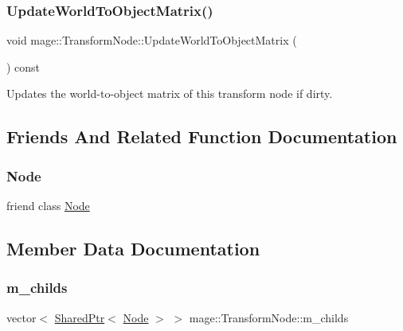 \subsubsection{\texorpdfstring{Update\+World\+To\+Object\+Matrix()}{UpdateWorldToObjectMatrix()}}
{\footnotesize\ttfamily void mage\+::\+Transform\+Node\+::\+Update\+World\+To\+Object\+Matrix (\begin{DoxyParamCaption}{ }\end{DoxyParamCaption}) const\hspace{0.3cm}{\ttfamily [private]}}

Updates the world-\/to-\/object matrix of this transform node if dirty. 

\subsection{Friends And Related Function Documentation}
\hypertarget{classmage_1_1_transform_node_a6db9d28bd448a131448276ee03de1e6d}{}\label{classmage_1_1_transform_node_a6db9d28bd448a131448276ee03de1e6d} 
\subsubsection{\texorpdfstring{Node}{Node}}
{\footnotesize\ttfamily friend class \hyperlink{classmage_1_1_node}{Node}\hspace{0.3cm}{\ttfamily [friend]}}



\subsection{Member Data Documentation}
\hypertarget{classmage_1_1_transform_node_ae26b5d4c920a3743354b6f28c8b41651}{}\label{classmage_1_1_transform_node_ae26b5d4c920a3743354b6f28c8b41651} 
\subsubsection{\texorpdfstring{m\+\_\+childs}{m\_childs}}
{\footnotesize\ttfamily vector$<$ \hyperlink{namespacemage_a1e01ae66713838a7a67d30e44c67703e}{Shared\+Ptr}$<$ \hyperlink{classmage_1_1_node}{Node} $>$ $>$ mage\+::\+Transform\+Node\+::m\+\_\+childs\hspace{0.3cm}{\ttfamily [private]}}

